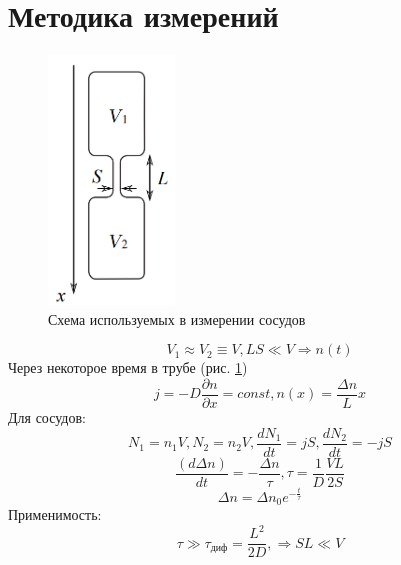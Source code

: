 \documentclass[a4paper,12pt]{article}
\begin{document}
\section{Методика измерений}
\begin{figure}[h!]
\begin{center}
    \includegraphics[width=0.3\textwidth]{sxema.png}
\end{center}
    \caption{Схема используемых в измерении сосудов} \label{sxema.png}
\end{figure}
\begin{equation}
    V_1 \approx V_2\equiv V, LS\ll V \Rightarrow n(t)
\end{equation}
    Через некоторое время в трубе (рис. \ref{sxema.png})
\begin{equation}
    j = -D\frac{\partial n}{\partial x} = const, n(x) = \frac{\Delta n}{L}x
\end{equation}
    Для сосудов:
\begin{equation}
    N_1=n_1V, N_2=n_2V, \frac{dN_1}{dt}=jS, \frac{dN_2}{dt}=-jS
\end{equation}
\begin{equation}
    \frac{(d\Delta n)}{dt} =- \frac{\Delta n}{\tau}, \tau = \frac{1}{D}\frac{VL}{2S}
\end{equation}
\begin{equation}
    \Delta n = \Delta n_0 e^{-\frac{t}{\tau}}
\end{equation}
    Применимость:
\begin{equation}
    \tau \gg \tau_{\text{диф}}=\frac{L^2}{2D}, \Rightarrow SL\ll V
\end{equation}
\end{document}
